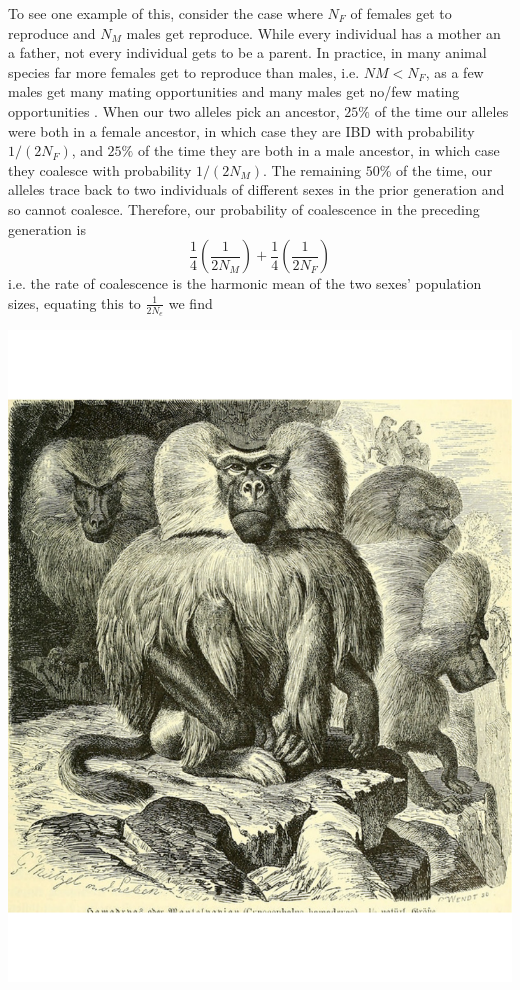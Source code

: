 To see one example of this, consider the case where $N_F$ of  females get to reproduce and $N_M$ males get reproduce.
While every individual has a mother an a father, not every individual gets to be a parent. In practice, in many animal species far more females get to reproduce than males, i.e. $NM <N_F$, as a few males get many mating opportunities and many males get no/few mating opportunities \citep[see ][for a broad analysis, and note that there a certainly many exceptions to this general pattern]{janicke:16}. When our two alleles pick an ancestor, $25\%$ of the time our alleles were both in a female ancestor, in which case they are IBD with probability $1/(2N_F)$, and $25\%$ of the time they are both in a
male ancestor, in which case they coalesce with probability
$1/(2N_M)$. The remaining $50\%$ of the time, our alleles trace back to two individuals of different sexes in the prior generation and so cannot coalesce.  Therefore, our probability of coalescence in the preceding generation is 
\begin{equation}
\frac{1}{4}\left(\frac{1}{2N_M} \right)+\frac{1}{4}\left(\frac{1}{2N_F} \right) %
\end{equation}
i.e. the rate of coalescence is the harmonic mean of the two sexes' population sizes, equating this to $\frac{1}{2N_e}$ we find

\begin{marginfigure}
\begin{center}
\includegraphics[width= 0.7 \textwidth]{illustration_images/Genetic_drift/Hamadryas_baboon/Hamadryas_baboon.pdf}
\end{center}
\caption{Male Hamadryas baboons. Brehm's Tierleben. Brehm,
  A.E. 1893. Up to ten females live in a harem with a single male.  %
} \label{fig:Hamadryas_baboon}  
\end{marginfigure} 

